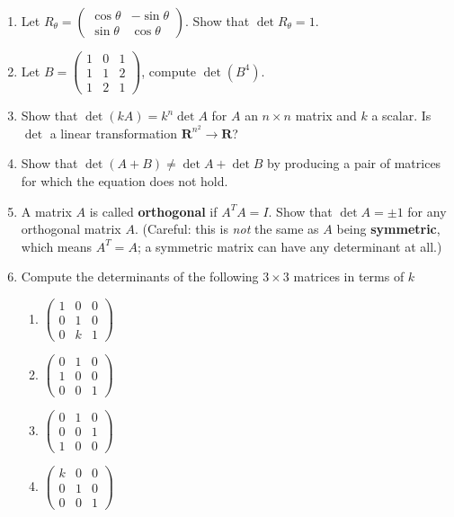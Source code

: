 \documentclass[12pt]{article}
\numberwithin{equation}{subsection}
\numberwithin{figure}{subsection}
\theoremstyle{note}
\begin{document}
\begin{enumerate}[label=\arabic*.]
\item Let $R_{\theta}=\begin{pmatrix} \cos \theta & -\sin\theta \\ \sin \theta & \cos \theta\end{pmatrix}$. Show that $\det R_{\theta}=1$. 
\item Let $B=\begin{pmatrix} 1 & 0 & 1 \\ 1 & 1 & 2 \\ 1 & 2 & 1 \end{pmatrix}$, compute $\det(B^4)$. 
\item Show that $\det (kA)=k^n \det A$ for $A$ an $n\times n$ matrix and $k$ a scalar. Is $\det$ a linear transformation $\mathbf{R}^{n^2}\to\mathbf{R}$?

\item Show that $\det(A+B)\neq \det A+\det B$ by producing a pair of matrices for which the equation does not hold.
 
\item A matrix $A$ is called \textbf{orthogonal} if $A^TA=I$. Show that $\det A=\pm 1$ for any orthogonal matrix $A$. (Careful: this is \textit{not} the same as $A$ being \textbf{symmetric}, which means $A^T=A$; a symmetric matrix can have any determinant at all.)

\item Compute the determinants of the following $3\times 3$ matrices in terms of $k$
\begin{enumerate}
	\item $\begin{pmatrix} 1 & 0 & 0 \\ 0 & 1 & 0 \\ 0 & k & 1\end{pmatrix}$
	\item $\begin{pmatrix} 0 & 1 & 0 \\ 1 & 0 & 0 \\ 0 & 0 & 1\end{pmatrix}$
	\item $\begin{pmatrix} 0 & 1 & 0 \\ 0 & 0 & 1 \\ 1 & 0 & 0\end{pmatrix}$
	\item $\begin{pmatrix} k & 0 & 0 \\ 0 & 1 & 0 \\ 0 & 0  & 1\end{pmatrix}$


\end{enumerate}
\end{enumerate}
\end{document}
